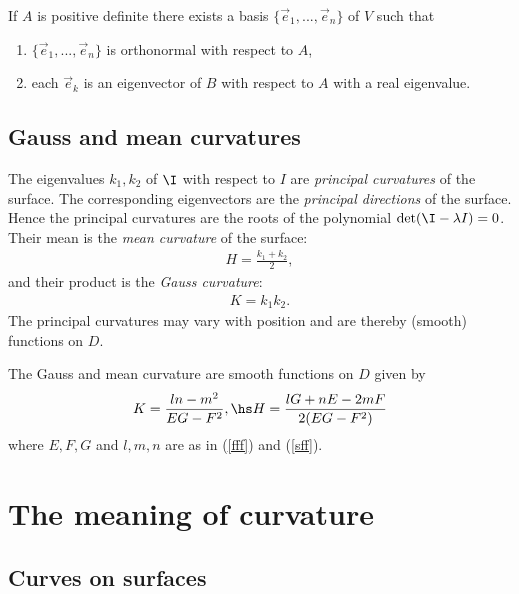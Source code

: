 \documentclass{article}
\begin{document}
\begin{proposition}[Notes 8.3]
    If $A$ is positive definite there exists a basis $\{\vec e_1, ..., \vec e_n\}$ of $V$ such that
    \begin{enumerate}
        \item $\{\vec e_1,...,\vec e_n\}$ is orthonormal with respect to $A$,
        \item each $\vec e_k$ is an eigenvector of $B$ with respect to $A$ with a real eigenvalue.
    \end{enumerate}
\end{proposition}

\subsection{Gauss and mean curvatures}

\begin{definition}
    The eigenvalues $k_1,k_2$ of $\I$ with respect to $I$ are \emph{principal curvatures} of the surface.
    The corresponding eigenvectors are the \emph{principal directions} of the surface. Hence the
    principal curvatures are the roots of the polynomial $\det(\I-\lambda I)=0$. Their mean is the
    \emph{mean curvature} of the surface:
    \begin{align*}
        H=\frac{k_1+k_2}{2},
    \end{align*}
    and their product is the \emph{Gauss curvature}:
    \begin{align*}
        K = k_1k_2.
    \end{align*}
    The principal curvatures may vary with position and are thereby (smooth) functions on $D$.
\end{definition}

\begin{proposition}[Notes 8.5]
    The Gauss and mean curvature are smooth functions on $D$ given by 
    \begin{align*}
        K=\frac{ln-m^2}{EG-F^2},\hs
        H=\frac{lG+nE-2mF}{2(EG-F^2)}
    \end{align*} 
    where $E,F,G$ and $l,m,n$ are as in (\ref{fff}) and (\ref{sff}).
\end{proposition}

\section{The meaning of curvature}

\subsection{Curves on surfaces}
\end{document}
